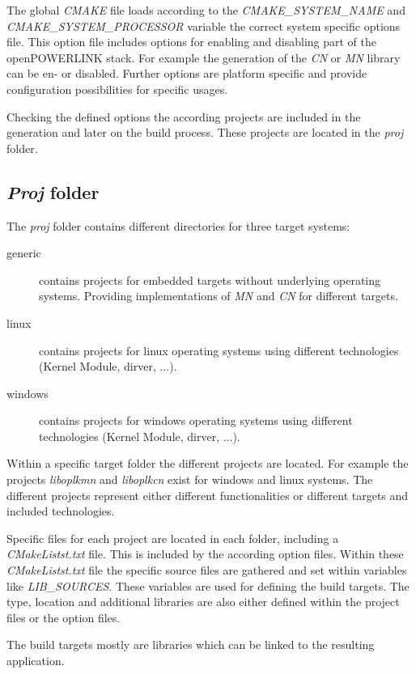 The global \emph{CMAKE} file loads according to the \emph{CMAKE\_SYSTEM\_NAME} and \emph{CMAKE\_SYSTEM\_PROCESSOR} variable the correct system specific options file.
This option file includes options for enabling and disabling part of the openPOWERLINK stack.
For example the generation of the \emph{CN} or \emph{MN} library can be en- or disabled.
Further options are platform specific and provide configuration possibilities for specific usages.

Checking the defined options the according projects are included in the generation and later on the build process.
These projects are located in the \emph{proj} folder.


\subsection{\emph{Proj} folder}
\label{sec:oplk_structure_proj}
The \emph{proj} folder contains different directories for three target systems:

\begin{description}
    \item[generic] contains projects for embedded targets without underlying operating systems.
    Providing implementations of \emph{MN} and \emph{CN} for different targets.
    \item[linux] contains projects for linux operating systems using different technologies (Kernel Module, dirver, ...).
    \item[windows] contains projects for windows operating systems using different technologies (Kernel Module, dirver, ...).
\end{description}

Within a specific target folder the different projects are located.
For example the projects \emph{liboplkmn} and \emph{liboplkcn} exist for windows and linux systems.
The different projects represent either different functionalities or different targets and included technologies.

Specific files for each project are located in each folder, including a \emph{CMakeListst.txt} file.
This is included by the according option files.
Within these \emph{CMakeListst.txt} file the specific source files are gathered and set within variables like \emph{LIB\_SOURCES}.
These variables are used for defining the build targets.
The type, location and additional libraries are also either defined within the project files or the option files.

The build targets mostly are libraries which can be linked to the resulting application.

